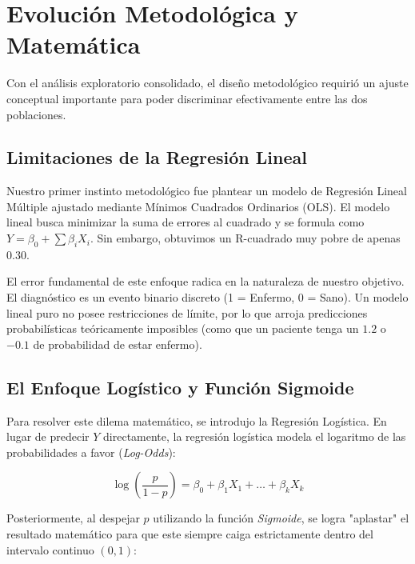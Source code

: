 \documentclass[twocolumn,10pt]{article}
\begin{document}
\section{Evolución Metodológica y Matemática}

Con el análisis exploratorio consolidado, el diseño metodológico requirió un ajuste conceptual importante para poder discriminar efectivamente entre las dos poblaciones.

\subsection{Limitaciones de la Regresión Lineal}

Nuestro primer instinto metodológico fue plantear un modelo de Regresión Lineal Múltiple ajustado mediante Mínimos Cuadrados Ordinarios (OLS). El modelo lineal busca minimizar la suma de errores al cuadrado y se formula como $Y = \beta_0 + \sum \beta_i X_i$. Sin embargo, obtuvimos un R-cuadrado muy pobre de apenas 0.30. 

El error fundamental de este enfoque radica en la naturaleza de nuestro objetivo. El diagnóstico es un evento binario discreto (1 = Enfermo, 0 = Sano). Un modelo lineal puro no posee restricciones de límite, por lo que arroja predicciones probabilísticas teóricamente imposibles (como que un paciente tenga un $1.2$ o $-0.1$ de probabilidad de estar enfermo). 

\subsection{El Enfoque Logístico y Función Sigmoide}

Para resolver este dilema matemático, se introdujo la Regresión Logística. En lugar de predecir $Y$ directamente, la regresión logística modela el logaritmo de las probabilidades a favor (\textit{Log-Odds}):

\begin{equation}
\log\left(\frac{p}{1-p}\right) = \beta_0 + \beta_1 X_1 + \dots + \beta_k X_k
\label{eq:logodds}
\end{equation}

Posteriormente, al despejar $p$ utilizando la función \textit{Sigmoide}, se logra "aplastar" el resultado matemático para que este siempre caiga estrictamente dentro del intervalo continuo $(0, 1)$:
\end{document}

